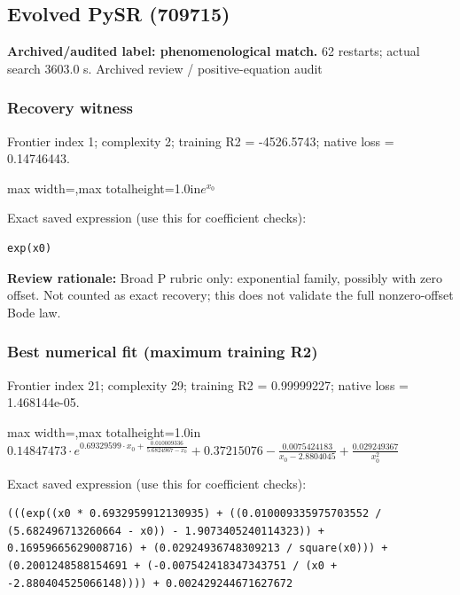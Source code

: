 \documentclass[10pt,letterpaper,landscape]{article}
\begin{document}
\begin{minipage}[t]{0.485\textwidth}
\subsection*{Evolved PySR (709715)}
\textbf{Archived/audited label: phenomenological match.} 62 restarts; actual search 3603.0 s.
{\small Archived review / positive-equation audit}
\subsubsection*{Recovery witness}
Frontier index 1; complexity 2; training R2 = -4526.5743; native loss = 0.14746443.
\begin{center}\begin{adjustbox}{max width=\linewidth,max totalheight=1.0in}$\displaystyle e^{x_{0}}$\end{adjustbox}\end{center}
{\scriptsize Exact saved expression (use this for coefficient checks):}
\begin{lstlisting}
exp(x0)
\end{lstlisting}
{\small\textbf{Review rationale:} Broad P rubric only: exponential family, possibly with zero offset. Not counted as exact recovery; this does not validate the full nonzero-offset Bode law.}
\subsubsection*{Best numerical fit (maximum training R2)}
Frontier index 21; complexity 29; training R2 = 0.99999227; native loss = 1.468144e-05.
\begin{center}\begin{adjustbox}{max width=\linewidth,max totalheight=1.0in}$\displaystyle 0.14847473 \cdot e^{0.69329599 \cdot x_{0} + \frac{0.010009336}{5.6824967 - x_{0}}} + 0.37215076 - \frac{0.0075424183}{x_{0} - 2.8804045} + \frac{0.029249367}{x_{0}^{2}}$\end{adjustbox}\end{center}
{\scriptsize Exact saved expression (use this for coefficient checks):}
\begin{lstlisting}
(((exp((x0 * 0.6932959912130935) + ((0.010009335975703552 / (5.682496713260664 - x0)) - 1.9073405240114323)) + 0.16959665629008716) + (0.02924936748309213 / square(x0))) + (0.2001248588154691 + (-0.007542418347343751 / (x0 + -2.880404525066148)))) + 0.002429244671627672
\end{lstlisting}
\end{minipage}
\clearpage{}\label{bode-10001}
\end{document}
